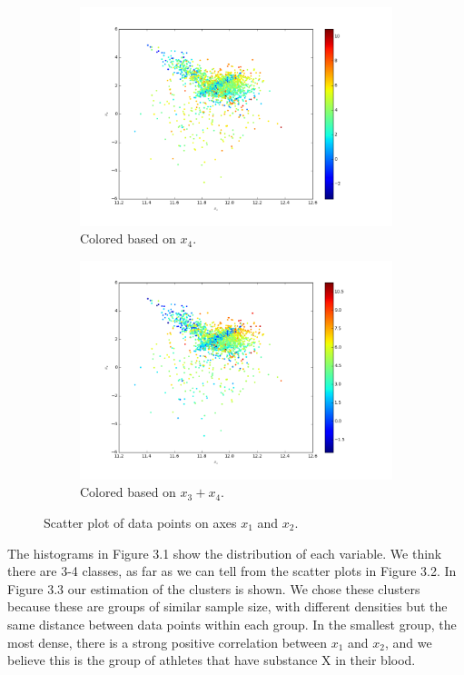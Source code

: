 \documentclass[a4paper,10pt]{article}
\numberwithin{equation}{section} %
\numberwithin{figure}{section} %
\numberwithin{table}{section} %
\theoremstyle{mytheor}
\begin{document}
\begin{enumerate}
\begin{figure}[h!]
\begin{subfigure}[b]{0.45\textwidth}
				\includegraphics[width=\textwidth]{scatter_x4.png}\vspace{-0.5cm}
				\caption{Colored based on $x_4$.}
			\end{subfigure}
			\begin{subfigure}[b]{0.45\textwidth}
				\includegraphics[width=\textwidth]{scatter_x3plusx4.png}\vspace{-0.5cm}
				\caption{Colored based on $x_3 + x_4$.}
			\end{subfigure}
   			\caption{\vspace{-0.1cm} Scatter plot of data points on axes $x_1$ and $x_2$.}\vspace{-0.2cm}
  		\end{figure}
		The histograms in Figure 3.1 show the distribution of each variable. We think there are 3-4 classes, as far as we can tell from the scatter plots in Figure 3.2. In Figure 3.3 our estimation of the clusters is shown. We chose these clusters because these are groups of similar sample size, with different densities but the same distance between data points within each group. In the smallest group, the most dense, there is a strong positive correlation between $x_1$ and $x_2$, and we believe this is the group of athletes that have substance X in their blood.

\end{enumerate}
\end{document}
